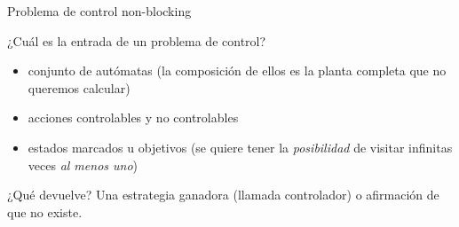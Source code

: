 \begin{frame}{Problema de control non-blocking}
    \begin{block}{¿Cuál es la entrada de un problema de control?}
        \begin{itemize}
          \item conjunto de autómatas (la composición de ellos es la planta completa que no queremos calcular)
          \item acciones controlables y no controlables
          \item estados marcados u objetivos (se quiere tener la \textit{posibilidad} de visitar infinitas veces \textit{al menos uno})
        \end{itemize}
    \end{block}

    \begin{block}{¿Qué devuelve?}
        Una estrategia ganadora (llamada controlador) o afirmación de que no existe.
    \end{block}

\end{frame}
